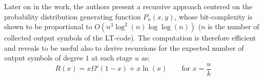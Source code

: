 Later on in the work, the authors present a recursive approach centered on the probability distribution generating function $P_u(x,y)$, whose bit-complexity is shown to be proportional to $O(n^3\log^2(n)\log\log(n))$ ($n$ is the number of collected output symbols of the LT-code). The computation is therefore efficient and reveals to be useful also to derive recursions for the expected number of output symbols of degree $1$ at each stage $u$ as:
\begin{equation}
  R(x) = x\Omega'(1-x)+x\ln(x) \qquad \text{for } x = \frac{u}{k}
\end{equation}
